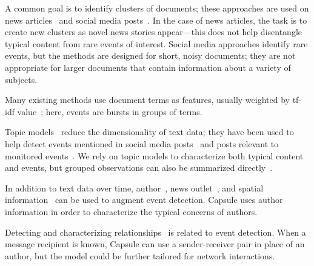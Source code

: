 A common goal is to identify clusters of documents; these approaches are used on news articles~\cite{zhao2012novel,zhao2007temporal,zhang2002novelty,li2005probabilistic,wang2007mining,allan1998line} and social media posts~\cite{VanDam:2012,lau2012line,jackoway2011identification,sakaki2010earthquake,reuter2012event,becker2010learning,sayyadi2009event}.  
In the case of news articles, the task is to create new clusters as novel news stories appear---this does not help disentangle typical content from rare events of interest.
Social media approaches identify rare events, but the methods are designed for short, noisy documents; they are not appropriate for larger documents that contain information about a variety of subjects.

Many existing methods use document terms as features, usually weighted by tf-idf value~\cite{fung2005parameter,kumaran2004text,brants2003system,das2011dynamic,zhao2007temporal,zhao2012novel}; here, events are bursts in groups of terms. %

Topic models~\cite{Blei:2012} reduce the dimensionality of text data; they have been used to help detect events mentioned in social media posts~\cite{lau2012line,dou2012leadline} and posts relevant to monitored events~\cite{VanDam:2012}.
We rely on topic models to characterize both typical content and events, but grouped observations can also be summarized directly~\cite{peng2007event,chakrabarti2011event,gao2012joint}.

In addition to text data over time, author~\cite{zhao2007temporal}, news outlet~\cite{wang2007mining}, and spatial information~\cite{Neill:2005,mathioudakis2010identifying,liu2011using} can be used to augment event detection.  Capsule uses author information in order to characterize the typical concerns of authors.

Detecting and characterizing relationships~\cite{schein2015bayesian,linderman2014discovering,das2011dynamic} is related to event detection.  When a message recipient is known, Capsule can use a sender-receiver pair in place of an author, but the model could be further tailored for network interactions.

